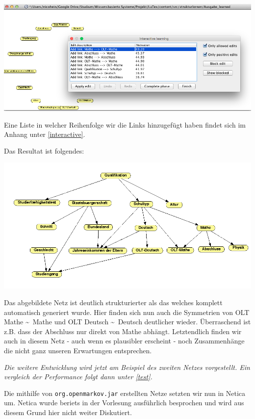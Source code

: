 \begin{center}
	\includegraphics[width=1.00\textwidth]{content/pictures/interaktive.png}
\end{center}

Eine Liste in welcher Reihenfolge wir die Links hinzugefügt haben findet sich im Anhang unter \ref{interactive}.

Das Resultat ist folgendes:

\begin{center}
	\includegraphics[width=1.00\textwidth]{content/pictures/interNetwork.png}
\end{center}

Das abgebildete Netz ist deutlich strukturierter als das welches komplett automatisch generiert wurde. Hier finden sich nun auch die Symmetrien von OLT Mathe \textasciitilde \ Mathe und OLT Deutsch  \textasciitilde \ Deutsch deutlicher wieder. Überraschend ist z.B. dass der Abschluss nur direkt von Mathe abhängt. Letztendlich finden wir auch in diesem Netz - auch wenn es plausibler erscheint - noch Zusammenhänge die nicht ganz unseren Erwartungen entsprechen. 

\textit{Die weitere Entwicklung wird jetzt am Beispiel des zweiten Netzes vorgestellt. Ein vergleich der Performance folgt dann unter \ref{test}.}

Die mithilfe von  \lstinline{org.openmarkov.jar} erstellten Netze setzten wir nun in Netica um. Netica wurde beriets in der Vorlesung ausführlich besprochen und wird aus diesem Grund hier nicht weiter Diskutiert.

